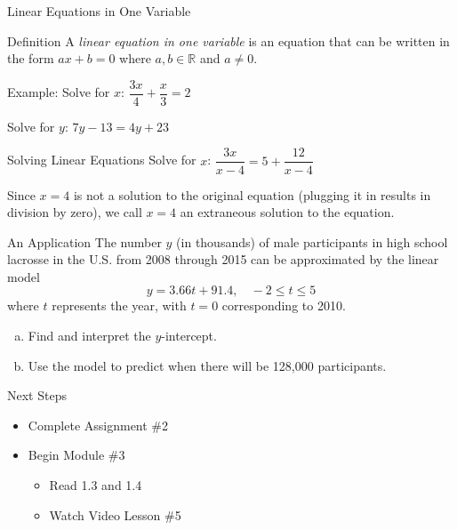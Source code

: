 \documentclass{beamer}
\def\R{\mathbb{R}} %
\begin{document}
\begin{frame}[t]{Linear Equations in One Variable}
\begin{block}{Definition}
A \textit{linear equation in one variable} is an equation that can be written in the form $ax + b = 0$ where $a,b\in\R$ and $a \neq 0$.
\end{block}

\pause

Example: Solve for $x$: $\dfrac{3x}{4} + \dfrac{x}{3} = 2$

\pause \vfill

Solve for $y$: $7y - 13 = 4y + 23$
\end{frame}

\begin{frame}[t]{Solving Linear Equations}
Solve for $x$: $\dfrac{3x}{x-4} = 5 + \dfrac{12}{x-4}$

\pause \vfill

Since $x = 4$ is not a solution to the original equation (plugging it in results in division by zero), we call $x = 4$ an extraneous solution to the equation.
\end{frame}

\begin{frame}[t]{An Application}
The number $y$ (in thousands) of male participants in high school lacrosse in the U.S. from 2008 through 2015 can be approximated by the linear model $$y = 3.66t + 91.4, \; \text{ } -2\leq t\leq 5$$ where $t$ represents the year, with $t=0$ corresponding to 2010. \begin{enumerate}[(a)]
\item Find and interpret the $y$-intercept.
\item Use the model to predict when there will be 128,000 participants.
\end{enumerate}
\end{frame}

\begin{frame}[t]{Next Steps}
\begin{itemize}
\item Complete Assignment \#2
\item Begin Module \#3
\begin{itemize}
\item Read 1.3 and 1.4
\item Watch Video Lesson \#5
\end{itemize}
\end{itemize}
\end{frame}
\end{document}
